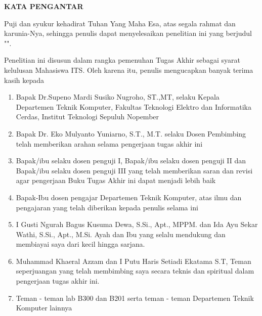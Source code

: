 \begin{center}
  \Large
  \textbf{KATA PENGANTAR}
\end{center}


\vspace{2ex}


Puji dan syukur kehadirat Tuhan Yang Maha Esa, atas segala rahmat dan karunia-Nya,
sehingga penulis dapat menyelesaikan penelitian ini yang berjudul
"\tatitle".


Penelitian ini disusun dalam rangka pemenuhan Tugas Akhir sebagai syarat
kelulusan Mahasiswa ITS. Oleh karena itu, penulis mengucapkan banyak terima kasih kepada

\begin{enumerate}[nolistsep]

  \item Bapak Dr.Supeno Mardi Susiko Nugroho, ST.,MT, selaku Kepala Departemen Teknik Komputer, Fakultas Teknologi Elektro dan Informatika Cerdas, Institut Teknologi Sepuluh Nopember

  \item Bapak Dr. Eko Mulyanto Yuniarno, S.T., M.T. selaku Dosen Pembimbing telah memberikan arahan selama pengerjaan tugas akhir ini

  \item Bapak/ibu selaku dosen penguji I, Bapak/ibu selaku dosen penguji II dan Bapak/ibu selaku dosen penguji III yang telah memberikan saran dan revisi agar pengerjaan Buku Tugas Akhir ini dapat menjadi lebih baik

  \item Bapak-Ibu dosen pengajar Departemen Teknik Komputer, atas ilmu dan pengajaran yang telah diberikan kepada penulis selama ini 
  
  \item I Gusti Ngurah Bagus Kusuma Dewa, S.Si., Apt., MPPM. dan  Ida Ayu Sekar Wathi, S.Si., Apt., M.Si. Ayah dan Ibu yang selalu mendukung dan membiayai saya dari kecil hingga sarjana.

  \item Muhammad Khaeral Azzam dan I Putu Haris Setiadi Ekatama S.T, Teman seperjuangan yang telah membimbing saya secara teknis dan spiritual dalam pengerjaan tugas akhir ini.
  
  \item Teman - teman lab B300 dan B201 serta teman - teman Departemen Teknik Komputer lainnya

\end{enumerate}

